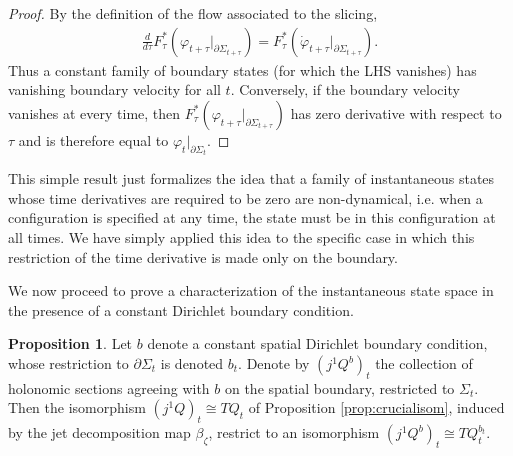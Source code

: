 \documentclass{article}
\theoremstyle{definition}
\newtheorem{proposition}[definition]{Proposition}
\begin{document}
\begin{proof}
By the definition of the flow associated to the slicing,
\begin{align*}
    \frac{d}{d\tau}
    F_\tau^*(\varphi_{t+\tau}|_{\partial\Sigma_{t+\tau}})
    =
    F_\tau^*(\dot{\varphi}_{t+\tau}
    |_{\partial\Sigma_{t+\tau}}).
\end{align*}
Thus a constant family of boundary states (for which the LHS vanishes) has vanishing boundary velocity for all $t$.
Conversely, if the boundary velocity vanishes at every time, then
$F_\tau^*\left(\varphi_{t+\tau}|_{\partial\Sigma_{t+\tau}}\right)$ has zero derivative with respect to $\tau$ and
is therefore equal to $\varphi_t|_{\partial\Sigma_t}$.
\end{proof}

This simple result just formalizes the idea that a family of instantaneous states whose time derivatives are required to be zero are non-dynamical, i.e. when a configuration is specified at any time, the state must be in this configuration at all times. We have simply applied this idea to the specific case in which this restriction of the time derivative is made only on the boundary.

We now proceed to prove a characterization of the instantaneous state space in the presence of a constant Dirichlet boundary condition. 

\begin{proposition}\label{beautifulprop}
    Let $b$ denote a constant spatial Dirichlet boundary condition, whose restriction to $\partial \Sigma_t$ is denoted $b_t$. Denote by $(j^1Q^b)_t$ the collection of holonomic sections agreeing with $b$ on the spatial boundary, restricted to $\Sigma_t$. Then the isomorphism $(j^1Q)_t\cong TQ_t$ of Proposition \ref{prop:crucialisom}, induced by the jet decomposition map $\beta_\zeta$, restrict to an isomorphism $(j^1Q^b)_t\cong TQ^{b_t}_t$.
\end{proposition}
\end{document}
